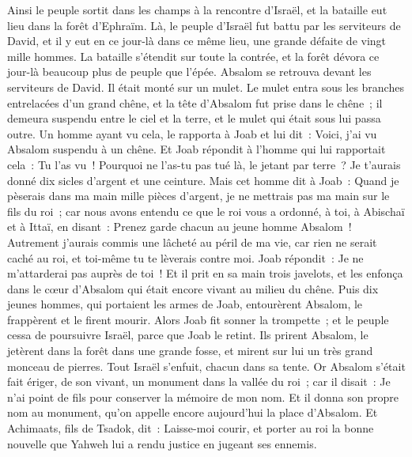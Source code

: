 \begin{multicols}{2}
Ainsi le peuple sortit dans les champs à la rencontre d'Israël, et la bataille eut lieu dans la forêt d'Ephraïm.
Là, le peuple d'Israël fut battu par les serviteurs de David, et il y eut en ce jour-là dans ce même lieu, une grande défaite de vingt mille hommes.
La bataille s'étendit sur toute la contrée, et la forêt dévora ce jour-là beaucoup plus de peuple que l'épée.
Absalom se retrouva devant les serviteurs de David. Il était monté sur un mulet. Le mulet entra sous les branches entrelacées d'un grand chêne, et la tête d'Absalom fut prise dans le chêne~; il demeura suspendu entre le ciel et la terre, et le mulet qui était sous lui passa outre.
Un homme ayant vu cela, le rapporta à Joab et lui dit~: Voici, j'ai vu Absalom suspendu à un chêne.
Et Joab répondit à l'homme qui lui rapportait cela~: Tu l'as vu~! Pourquoi ne l'as-tu pas tué là, le jetant par terre~? Je t'aurais donné dix sicles d'argent et une ceinture.
Mais cet homme dit à Joab~: Quand je pèserais dans ma main mille pièces d'argent, je ne mettrais pas ma main sur le fils du roi~; car nous avons entendu ce que le roi vous a ordonné, à toi, à Abischaï et à Ittaï, en disant~: Prenez garde chacun au jeune homme Absalom~!
Autrement j'aurais commis une lâcheté au péril de ma vie, car rien ne serait caché au roi, et toi-même tu te lèverais contre moi.
Joab répondit~: Je ne m'attarderai pas auprès de toi~! Et il prit en sa main trois javelots, et les enfonça dans le cœur d'Absalom qui était encore vivant au milieu du chêne.
Puis dix jeunes hommes, qui portaient les armes de Joab, entourèrent Absalom, le frappèrent et le firent mourir.
Alors Joab fit sonner la trompette~; et le peuple cessa de poursuivre Israël, parce que Joab le retint.
Ils prirent Absalom, le jetèrent dans la forêt dans une grande fosse, et mirent sur lui un très grand monceau de pierres. Tout Israël s'enfuit, chacun dans sa tente.
Or Absalom s'était fait ériger, de son vivant, un monument dans la vallée du roi~; car il disait~: Je n'ai point de fils pour conserver la mémoire de mon nom. Et il donna son propre nom au monument, qu'on appelle encore aujourd'hui la place d'Absalom.
Et Achimaats, fils de Tsadok, dit~: Laisse-moi courir, et porter au roi la bonne nouvelle que Yahweh lui a rendu justice en jugeant ses ennemis.

\end{multicols}
